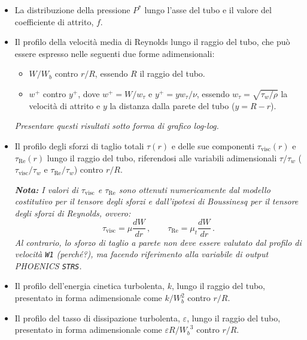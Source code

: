 \begin{itemize}
    \item La distribuzione della pressione $P^*$ lungo l'asse del tubo e il valore del coefficiente di attrito, $f$.
    
    \item Il profilo della velocità media di Reynolds lungo il raggio del tubo, che può essere espresso nelle seguenti due forme adimensionali:
    \begin{itemize}
        \item $W/W_b$ contro $r/R$, essendo $R$ il raggio del tubo.
        \item $w^+$ contro $y^+$, dove $w^+=W/w_{\tau}$ e $y^+=yw_{\tau}/\nu$, essendo $w_{\tau}=\sqrt{\tau_{w}/\rho}$ la velocità di attrito e $y$ la distanza dalla parete del tubo ($y=R-r$).
    \end{itemize}

    \emph{Presentare questi risultati sotto forma di grafico log-log.}
    
    \item Il profilo degli sforzi di taglio totali $\tau(r)$ e delle sue componenti $\tau_{\text{visc}}(r)$ e $\tau_{\text{Re}}(r)$ lungo il raggio del tubo, riferendosi alle variabili adimensionali $\tau/\tau_{w}$ ($\tau_{\text{visc}}/\tau_{w}$ e $\tau_{\text{Re}}/\tau_{w}$) contro $r/R$.
    
    \vspace{0.3em}

    \emph{\textbf{Nota:} I valori di $\tau_{\text{visc}}$ e $\tau_{\text{Re}}$ sono ottenuti numericamente dal modello costitutivo per il tensore degli sforzi e dall'ipotesi di Boussinesq per il tensore degli sforzi di Reynolds, ovvero:}
    \begin{equation}
    \label{eq:tauss}
        \tau_{\text{visc}} = \mu \frac{dW}{dr}\,, \qquad  \tau_{\text{Re}} = \mu_{t}\frac{dW}{dr}\,.
    \end{equation}
    \emph{Al contrario, lo sforzo di taglio a parete non deve essere valutato dal profilo di velocità \texttt{W1} (perché?), ma facendo riferimento alla variabile di output PHOENICS \texttt{STRS}.}
    
    \item Il profilo dell'energia cinetica turbolenta, $k$, lungo il raggio del tubo, presentato in forma adimensionale come $k/W_{b}^{2}$ contro $r/R$.
    
    \item Il profilo del tasso di dissipazione turbolenta, $\varepsilon$, lungo il raggio del tubo, presentato in forma adimensionale come $\varepsilon R/{W_{b}}^{3}$ contro $r/R$.
\end{itemize}

